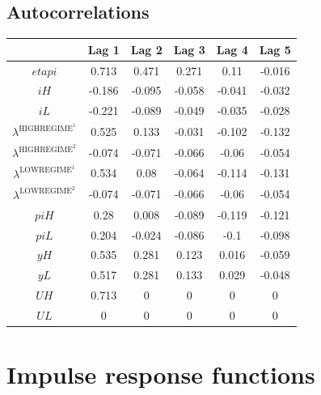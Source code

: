 \subsection{Autocorrelations}

\begin{tabular}{c|ccccc|}
  & Lag 1 & Lag 2 & Lag 3 & Lag 4 & Lag 5\\
\hline
${e\!t\!a\!p\!i}$ & 0.713 & 0.471 & 0.271 & 0.11 & -0.016 \\
${i\!H}$ & -0.186 & -0.095 & -0.058 & -0.041 & -0.032 \\
${i\!L}$ & -0.221 & -0.089 & -0.049 & -0.035 & -0.028 \\
$\lambda^{\mathrm{HIGHREGIME}^{\mathrm{1}}}$ & 0.525 & 0.133 & -0.031 & -0.102 & -0.132 \\
$\lambda^{\mathrm{HIGHREGIME}^{\mathrm{2}}}$ & -0.074 & -0.071 & -0.066 & -0.06 & -0.054 \\
$\lambda^{\mathrm{LOWREGIME}^{\mathrm{1}}}$ & 0.534 & 0.08 & -0.064 & -0.114 & -0.131 \\
$\lambda^{\mathrm{LOWREGIME}^{\mathrm{2}}}$ & -0.074 & -0.071 & -0.066 & -0.06 & -0.054 \\
${p\!i\!H}$ & 0.28 & 0.008 & -0.089 & -0.119 & -0.121 \\
${p\!i\!L}$ & 0.204 & -0.024 & -0.086 & -0.1 & -0.098 \\
${y\!H}$ & 0.535 & 0.281 & 0.123 & 0.016 & -0.059 \\
${y\!L}$ & 0.517 & 0.281 & 0.133 & 0.029 & -0.048 \\
${U\!H}$ & 0.713 & 0 & 0 & 0 & 0 \\
${U\!L}$ & 0 & 0 & 0 & 0 & 0 \\
\hline
\end{tabular}



\pagebreak

\section{Impulse response functions}

